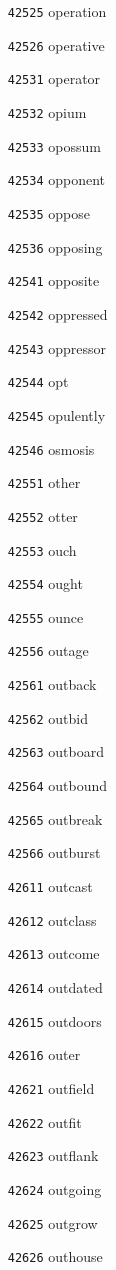 \documentclass[twoside,11pt]{article}
\begin{document}
\begin{multicols}{5}
\begin{enumerate}
\item[\texttt{42525}] operation
\item[\texttt{42526}] operative
\item[\texttt{42531}] operator
\item[\texttt{42532}] opium
\item[\texttt{42533}] opossum
\item[\texttt{42534}] opponent
\item[\texttt{42535}] oppose
\item[\texttt{42536}] opposing
\item[\texttt{42541}] opposite
\item[\texttt{42542}] oppressed
\item[\texttt{42543}] oppressor
\item[\texttt{42544}] opt
\item[\texttt{42545}] opulently
\item[\texttt{42546}] osmosis
\item[\texttt{42551}] other
\item[\texttt{42552}] otter
\item[\texttt{42553}] ouch
\item[\texttt{42554}] ought
\item[\texttt{42555}] ounce
\item[\texttt{42556}] outage
\item[\texttt{42561}] outback
\item[\texttt{42562}] outbid
\item[\texttt{42563}] outboard
\item[\texttt{42564}] outbound
\item[\texttt{42565}] outbreak
\item[\texttt{42566}] outburst
\item[\texttt{42611}] outcast
\item[\texttt{42612}] outclass
\item[\texttt{42613}] outcome
\item[\texttt{42614}] outdated
\item[\texttt{42615}] outdoors
\item[\texttt{42616}] outer
\item[\texttt{42621}] outfield
\item[\texttt{42622}] outfit
\item[\texttt{42623}] outflank
\item[\texttt{42624}] outgoing
\item[\texttt{42625}] outgrow
\item[\texttt{42626}] outhouse

\end{enumerate}
\end{multicols}
\end{document}

